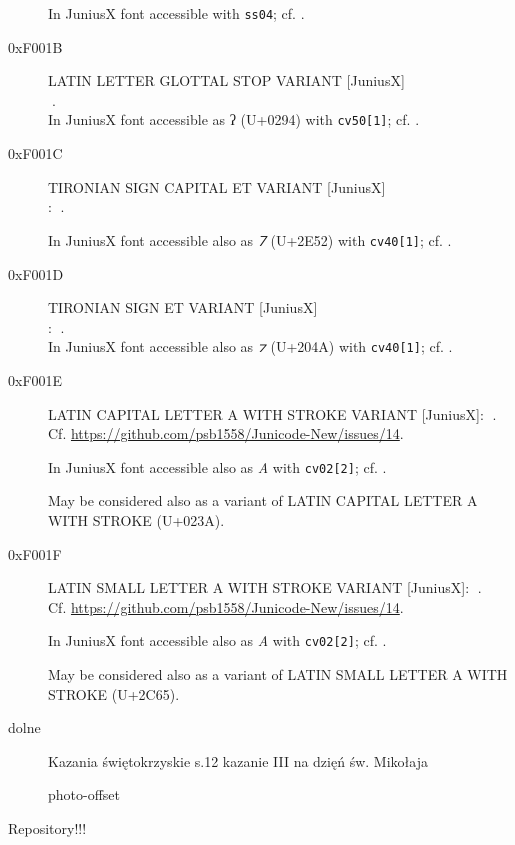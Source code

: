 \documentclass{article}
\newcommand{\Jglyph}[1]{{\relsize{2}\J#1}}
\begin{document}
\begin{description}
    In JuniusX font accessible  with \texttt{ss04};
  cf. \autocite[p. 6]{baker20:_opent_featur_junius_junius}.


\item [0xF001B] LATIN LETTER GLOTTAL STOP VARIANT [JuniusX]\\
  \Jglyph{󰀛}.\\%

    In JuniusX font accessible as ʔ (U+0294)  with \texttt{cv50[1]};
  cf. \autocite[p. 11]{baker20:_opent_featur_junius_junius}.


\item [0xF001C] TIRONIAN SIGN CAPITAL ET VARIANT [JuniusX]\\:
\Jglyph{󰀜}.%

In JuniusX font accessible also as \textit{⹒} (U+2E52) with \texttt{cv40[1]};
  cf. \autocite[p. 12]{baker20:_opent_featur_junius_junius}.

\item [0xF001D] TIRONIAN SIGN ET VARIANT [JuniusX]\\:
  \Jglyph{󰀝}.\\%

  In JuniusX font accessible also as \textit{⁊} (U+204A) with \texttt{cv40[1]};
  cf. \autocite[p. 12]{baker20:_opent_featur_junius_junius}.

\item[0xF001E] LATIN CAPITAL LETTER A WITH STROKE
  VARIANT [JuniusX]: \Jglyph{󰀞}.\\
  Cf. \url{https://github.com/psb1558/Junicode-New/issues/14}.
  
  In JuniusX font accessible also as \textit{A} with \texttt{cv02[2]};
  cf. \autocite[p. 7]{baker20:_opent_featur_junius_junius}.
% 

    May be considered also as a variant of LATIN CAPITAL LETTER A WITH
  STROKE (U+023A).

  
\item [0xF001F] LATIN SMALL LETTER A WITH STROKE  VARIANT [JuniusX]: 
  \Jglyph{󰀟}.\\ Cf. \url{https://github.com/psb1558/Junicode-New/issues/14}.

  In JuniusX font accessible also as \textit{A} with \texttt{cv02[2]};
  cf. \autocite[p. 7]{baker20:_opent_featur_junius_junius}.

  May be considered also as a variant of LATIN SMALL LETTER A WITH
  STROKE (U+2C65).
\item[dolne]
  Kazania świętokrzyskie
s.12 kazanie III na dzięń św. Mikołaja
  
  \cite{vrtel-wierczyński50:_wybór} photo-offset

\end{description}

Repository!!!
\printbibliography
\end{document}
